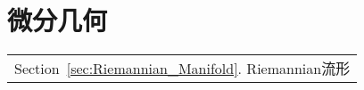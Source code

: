 \part{微分几何}\label{Part:Differential_Geometry}
			\begin{margintable}\vspace{1.4in}\footnotesize
				\begin{tabularx}{\marginparwidth}{|X}
					Section~\ref{sec:Riemannian_Manifold}. Riemannian流形\\
				\end{tabularx}
			\end{margintable}
	